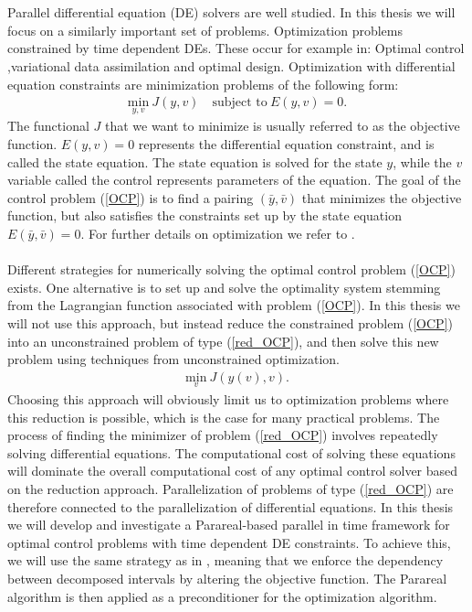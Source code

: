 \\
\\
Parallel differential equation (DE) solvers are well studied. In this thesis we will focus on a similarly important set of problems. Optimization problems constrained by time dependent DEs. These occur for example in: Optimal control ,variational data assimilation and optimal design. Optimization with differential equation constraints are minimization problems of the following form:
\begin{align}
\underset{y,v}{\text{min}} \ J(y,v) \quad \textrm{subject to} \ E(y,v)=0. \label{OCP}
\end{align}
The functional $J$ that we want to minimize is usually referred to as the objective function. $E(y,v)=0$ represents the differential equation constraint, and is called the state equation. The state equation is solved for the state $y$, while the $v$ variable called the control represents parameters of the equation. The goal of the control problem (\ref{OCP}) is to find a pairing $(\bar y,\bar v)$ that minimizes the objective function, but also satisfies the constraints set up by the state equation $ E(\bar y,\bar v)=0$.  For further details on optimization we refer to \cite{hinze2008optimization}.
\\
\\
Different strategies for numerically solving the optimal control problem (\ref{OCP}) exists. One alternative is to set up and solve the optimality system stemming from the Lagrangian function associated with problem (\ref{OCP}). In this thesis we will not use this approach, but instead reduce the constrained problem (\ref{OCP}) into an unconstrained problem of type (\ref{red_OCP}), and then solve this new problem using techniques from unconstrained optimization. 
\begin{align}
\underset{v}{\text{min}} \ J(y(v),v). \label{red_OCP}
\end{align}
Choosing this approach will obviously limit us to optimization problems where this reduction is possible, which is the case for many practical problems. The process of finding the minimizer of problem (\ref{red_OCP}) involves repeatedly solving differential equations. The computational cost of solving these equations will dominate the overall computational cost of any optimal control solver based on the reduction approach. Parallelization of problems of type (\ref{red_OCP}) are therefore connected to the parallelization of differential equations. In this thesis we will develop and investigate a Parareal-based parallel in time framework for optimal control problems with time dependent DE constraints. To achieve this, we will use the same strategy as in \cite{maday2002parareal}, meaning that we enforce the dependency between decomposed intervals by altering the objective function. The Parareal algorithm is then applied as a preconditioner for the optimization algorithm. 

